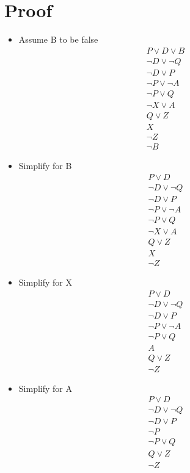 \documentclass{article}
\begin{document}
\section*{Proof}
\begin{itemize}
   \item Assume B to be false
   \begin{align*}
       P \lor D \lor B \\
       \neg D \lor \neg Q \\
       \neg D \lor P \\
       \neg P \lor \neg A \\
       \neg P \lor Q \\
       \neg X \lor A \\
       Q \lor Z \\
       X \\
       \neg Z \\
       \neg B
   \end{align*}
   
   \item Simplify for B
   \begin{align*}
       P \lor D \\
       \neg D \lor \neg Q \\
       \neg D \lor P \\
       \neg P \lor \neg A \\
       \neg P \lor Q \\
       \neg X \lor A \\
       Q \lor Z \\
       X \\
       \neg Z
   \end{align*}
   
   \item Simplify for X
   \begin{align*}
       P \lor D \\
       \neg D \lor \neg Q \\
       \neg D \lor P \\
       \neg P \lor \neg A \\
       \neg P \lor Q \\
       A \\
       Q \lor Z \\
       \neg Z
   \end{align*}
   
   \item Simplify for A
   \begin{align*}
       P \lor D \\
       \neg D \lor \neg Q \\
       \neg D \lor P \\
       \neg P \\
       \neg P \lor Q \\
       Q \lor Z \\
       \neg Z
   \end{align*}
   

\end{itemize}
\end{document}
